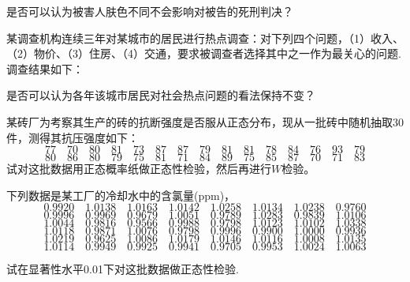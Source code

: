 \begin{xiti}
是否可以认为被害人肤色不同不会影响对被告的死刑判决？

\item 某调查机构连续三年对某城市的居民进行热点调查：对下列四个问题，（1）收入、（2）物价、（3）住房、（4）交通，要求被调查者选择其中之一作为最关心的问题.调查结果如下：

是否可以认为各年该城市居民对社会热点问题的看法保持不变？

\item 某砖厂为考察其生产的砖的抗断强度是否服从正态分布，现从一批砖中随机抽取30件，测得其抗压强度如下：
\[77 \quad 70 \quad 80 \quad 81 \quad 73 \quad 87 \quad 87 \quad 79 \quad 81 \quad 81 \quad78 \quad 84 \quad 76 \quad 93 \quad 79\]
\[80 \quad 86 \quad 80 \quad 79 \quad 75 \quad 81 \quad 71 \quad 84 \quad 89 \quad 75 \quad 85 \quad 87 \quad 70 \quad 71 \quad 83\]
试对这批数据用正态概率纸做正态性检验，然后再进行$W$检验。

\item 下列数据是某工厂的冷却水中的含氯量(ppm)，
\[
0.9920\quad 1.0138\quad 1.0163\quad 1.0142\quad 1.0258\quad 1.0134\quad 1.0238\quad 0.9760
\]
\[
0.9996\quad 0.9969\quad 0.9679\quad 1.0051\quad 0.9789\quad 1.0283\quad 0.9839\quad 1.0106
\]
\[
1.0044\quad 0.9816\quad 0.9566\quad 0.9988\quad 0.9798\quad 1.0123\quad 1.0102\quad 1.0338
\]
\[
1.0118\quad 0.9871\quad 1.0076\quad 0.9798\quad 0.9996\quad 0.9900\quad 1.0000\quad 0.9936
\]
\[
1.0219\quad 0.9625\quad 1.0086\quad 1.0179\quad 1.0146\quad 1.0116\quad 1.0008\quad 1.0135
\]
\[
1.0114\quad 0.9949\quad 0.9925\quad 0.9941\quad 0.9705\quad 0.9953\quad 1.0024\quad 1.0063
\]

试在显著性水平0.01下对这批数据做正态性检验.
\end{xiti}